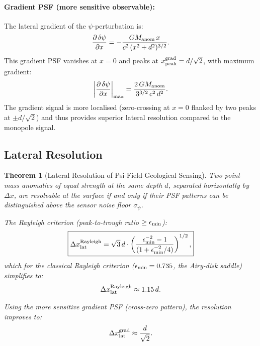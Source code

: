 \documentclass[aps,prd,twocolumn,superscriptaddress,nofootinbib]{revtex4-2}
\newtheorem{theorem}{Theorem}
\begin{document}
\paragraph{Gradient PSF (more sensitive observable):}
The lateral gradient of the $\psi$-perturbation is:
\begin{equation}
  \frac{\partial\,\delta\psi}{\partial x} = -\frac{G M_{\rm anom}\,x}
  {c^2\,(x^2 + d^2)^{3/2}}.
  \label{eq:grad-psf}
\end{equation}
This gradient PSF vanishes at $x = 0$ and peaks at
$x_{\rm peak}^{\rm grad} = d/\sqrt{2}$, with maximum gradient:
\begin{equation}
  \left|\frac{\partial\,\delta\psi}{\partial x}\right|_{\max}
  = \frac{2\,G M_{\rm anom}}{3^{3/2}\,c^2\,d^2}.
  \label{eq:grad-psf-max}
\end{equation}
The gradient signal is more localised (zero-crossing at $x = 0$
flanked by two peaks at $\pm d/\sqrt{2}$) and thus provides
superior lateral resolution compared to the monopole signal.

\subsection{Lateral Resolution}

\begin{theorem}[Lateral Resolution of Psi-Field Geological Sensing]
\label{thm:lateral-res}
Two point mass anomalies of equal strength at the same depth $d$,
separated horizontally by $\Delta x$, are resolvable at the surface
if and only if their PSF patterns can be distinguished above the
sensor noise floor $\sigma_\psi$.

The Rayleigh criterion (peak-to-trough ratio $\geq \epsilon_{\rm min}$):
\begin{equation}
  \boxed{
  \Delta x_{\rm lat}^{\rm Rayleigh} = \sqrt{3}\,d
  \cdot \left(\frac{\epsilon_{\rm min}^{-2} - 1}
  {(1 + \epsilon_{\rm min}^{-2}/4)}\right)^{1/2},
  }
  \label{eq:rayleigh}
\end{equation}
which for the classical Rayleigh criterion ($\epsilon_{\rm min} = 0.735$,
the Airy-disk saddle) simplifies to:
\begin{equation}
  \Delta x_{\rm lat}^{\rm Rayleigh} \approx 1.15\,d.
  \label{eq:rayleigh-simple}
\end{equation}

Using the more sensitive \emph{gradient} PSF (cross-zero pattern),
the resolution improves to:
\begin{equation}
  \Delta x_{\rm lat}^{\rm grad} \approx \frac{d}{\sqrt{2}}.
  \label{eq:grad-resolution}
\end{equation}
\end{theorem}
\end{document}
